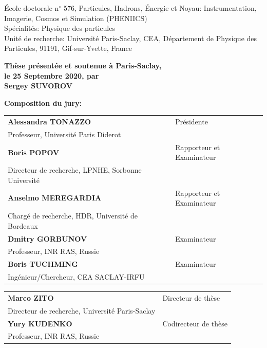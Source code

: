\documentclass[../main.tex]{subfiles}
\begin{document}
\vspace{15mm}

École doctorale n$^{\circ}$ 576, Particules, Hadrons, Énergie et Noyau: Instrumentation,
Imagerie, Cosmos et Simulation (PHENIICS)\\
\small Spécialités: Physique des particules\\
\footnotesize Unité de recherche: Université Paris-Saclay, CEA, Département de Physique des Particules, 91191, Gif-sur-Yvette, France
\vspace{15mm}

\textbf{Thèse présentée et soutenue à Paris-Saclay, \\ le 25 Septembre 2020, par}\\
\bigskip
\Large {\color{Prune} \textbf{Sergey SUVOROV}}


\vspace{\fill} %

\flushleft \small \textbf{Composition du jury:}
\bigskip



\scriptsize
\begin{tabular}{|p{8cm}l}
\textbf{Alessandra TONAZZO} &  Présidente \\
Professeur, Université Paris Diderot   &   \\

\textbf{Boris POPOV} &   Rapporteur et Examinateur \\
Directeur de recherche, LPNHE, Sorbonne Université & \\
\textbf{Anselmo MEREGARDIA} &  Rapporteur et Examinateur \\
Chargé de recherche, HDR, Université de Bordeaux  &   \\


\textbf{Dmitry GORBUNOV} &  Examinateur \\
Professeur, INR RAS, Russie   &   \\
\textbf{Boris TUCHMING} &  Examinateur \\
Ingénieur/Chercheur, CEA SACLAY-IRFU   &   \\

\end{tabular}

\medskip
\begin{tabular}{|p{8cm}l}\arrayrulecolor{white}
\textbf{Marco ZITO} &   Directeur de thèse \\
Directeur de recherche, Université Paris-Saclay & \\
\textbf{Yury KUDENKO} &   Codirecteur de thèse \\
Professeur, INR RAS, Russie  &   \\


\end{tabular}
\end{document}
